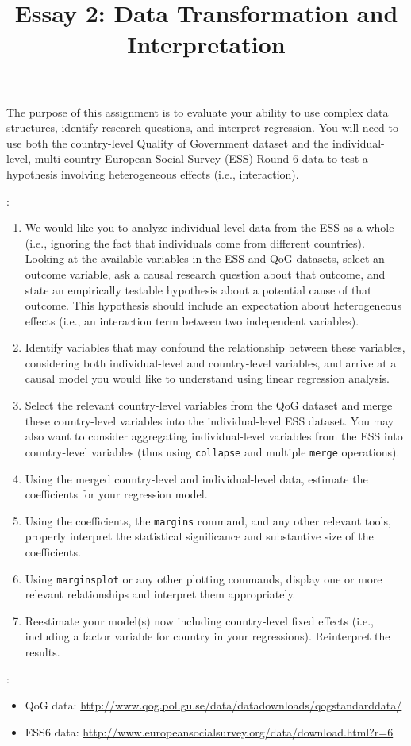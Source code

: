 \documentclass[a4paper,11pt]{article}
\title{Essay 2: Data Transformation and Interpretation}
\author{}
\date{}
\begin{document}
\maketitle

\vspace{-3em}


\vspace{1em}

\noindent The purpose of this assignment is to evaluate your ability to use complex data structures, identify research questions, and interpret regression. You will need to use both the country-level Quality of Government dataset and the individual-level, multi-country European Social Survey (ESS) Round 6 data to test a hypothesis involving heterogeneous effects (i.e., interaction).

\vspace{1em}

:
\begin{enumerate}\itemsep1em
\item We would like you to analyze individual-level data from the ESS as a whole (i.e., ignoring the fact that individuals come from different countries). Looking at the available variables in the ESS and QoG datasets, select an outcome variable, ask a causal research question about that outcome, and state an empirically testable hypothesis about a potential cause of that outcome. This hypothesis should include an expectation about heterogeneous effects (i.e., an interaction term between two independent variables).
\item Identify variables that may confound the relationship between these variables, considering both individual-level and country-level variables, and arrive at a causal model you would like to understand using linear regression analysis.
\item Select the relevant country-level variables from the QoG dataset and merge these country-level variables into the individual-level ESS dataset. You may also want to consider aggregating individual-level variables from the ESS into country-level variables (thus using \texttt{collapse} and multiple \texttt{merge} operations).
\item Using the merged country-level and individual-level data, estimate the coefficients for your regression model.
\item Using the coefficients, the \texttt{margins} command, and any other relevant tools, properly interpret the statistical significance and substantive size of the coefficients.
\item Using \texttt{marginsplot} or any other plotting commands, display one or more relevant relationships and interpret them appropriately.
\item Reestimate your model(s) now including country-level fixed effects (i.e., including a factor variable for country in your regressions). Reinterpret the results.
\end{enumerate}

\vspace{1em}

:
\begin{itemize}
\item QoG data: \url{http://www.qog.pol.gu.se/data/datadownloads/qogstandarddata/}
\item ESS6 data: \url{http://www.europeansocialsurvey.org/data/download.html?r=6}
\end{itemize}
\end{document}
